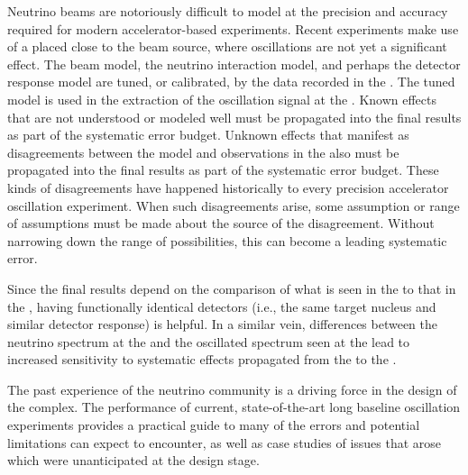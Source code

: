 Neutrino beams are notoriously difficult to model at the precision and accuracy required for modern accelerator-based experiments.  Recent  experiments make use of a   placed close to the beam source, where oscillations are not yet a significant effect.  The beam model, the neutrino interaction model, and perhaps the detector response model are tuned, or calibrated, by the data recorded in the  . The tuned model is used in the extraction of the oscillation signal at the  . Known effects that are not understood or modeled well must be propagated into the final results as part of the systematic error budget.  Unknown effects that manifest as disagreements between the model and observations in the   also must be propagated into the final results as part of the systematic error budget.  These kinds of disagreements have happened historically to every precision accelerator oscillation experiment.  When such disagreements arise, some assumption or range of assumptions must be made about the source of the disagreement.  Without narrowing down the range of possibilities, this can become a leading systematic error.



Since the final results depend on the comparison of what is seen in the   to that in the  , having functionally identical detectors (i.e., the same target nucleus and similar detector response) is helpful.  In a similar vein, differences between the neutrino spectrum at the   and the oscillated spectrum seen at the   lead to increased sensitivity to systematic effects propagated from the   to the  .

The past experience of the neutrino community is a driving force in the design of the    complex. 
The performance of  current, state-of-the-art long baseline oscillation experiments  provides a practical guide to many of the errors and potential limitations  can expect to encounter, as well as case studies of issues that arose which were unanticipated at the design stage. 

